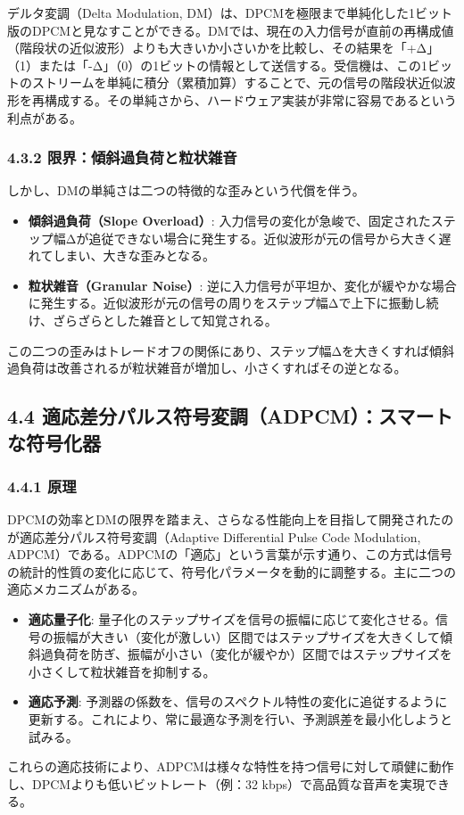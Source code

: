 \documentclass[
  a4paper,  %
  11pt,     %
]{ltjsarticle}%
\begin{document}
デルタ変調（Delta Modulation, DM）は、DPCMを極限まで単純化した1ビット版のDPCMと見なすことができる\cite{ref26}。DMでは、現在の入力信号が直前の再構成値（階段状の近似波形）よりも大きいか小さいかを比較し、その結果を「+Δ」（1）または「-Δ」（0）の1ビットの情報として送信する。受信機は、この1ビットのストリームを単純に積分（累積加算）することで、元の信号の階段状近似波形を再構成する。その単純さから、ハードウェア実装が非常に容易であるという利点がある。

\subsubsection{4.3.2 限界：傾斜過負荷と粒状雑音}

しかし、DMの単純さは二つの特徴的な歪みという代償を伴う\cite{ref27}。
\begin{itemize}
    \item \textbf{傾斜過負荷（Slope Overload）}: 入力信号の変化が急峻で、固定されたステップ幅Δが追従できない場合に発生する。近似波形が元の信号から大きく遅れてしまい、大きな歪みとなる。
    \item \textbf{粒状雑音（Granular Noise）}: 逆に入力信号が平坦か、変化が緩やかな場合に発生する。近似波形が元の信号の周りをステップ幅Δで上下に振動し続け、ざらざらとした雑音として知覚される。
\end{itemize}
この二つの歪みはトレードオフの関係にあり、ステップ幅Δを大きくすれば傾斜過負荷は改善されるが粒状雑音が増加し、小さくすればその逆となる。

\subsection{4.4 適応差分パルス符号変調（ADPCM）：スマートな符号化器}

\subsubsection{4.4.1 原理}

DPCMの効率とDMの限界を踏まえ、さらなる性能向上を目指して開発されたのが適応差分パルス符号変調（Adaptive Differential Pulse Code Modulation, ADPCM）である\cite{ref25}。ADPCMの「適応」という言葉が示す通り、この方式は信号の統計的性質の変化に応じて、符号化パラメータを動的に調整する。主に二つの適応メカニズムがある。
\begin{itemize}
    \item \textbf{適応量子化}: 量子化のステップサイズを信号の振幅に応じて変化させる。信号の振幅が大きい（変化が激しい）区間ではステップサイズを大きくして傾斜過負荷を防ぎ、振幅が小さい（変化が緩やか）区間ではステップサイズを小さくして粒状雑音を抑制する。
    \item \textbf{適応予測}: 予測器の係数を、信号のスペクトル特性の変化に追従するように更新する。これにより、常に最適な予測を行い、予測誤差を最小化しようと試みる。
\end{itemize}
これらの適応技術により、ADPCMは様々な特性を持つ信号に対して頑健に動作し、DPCMよりも低いビットレート（例：32 kbps）で高品質な音声を実現できる。
\end{document}
